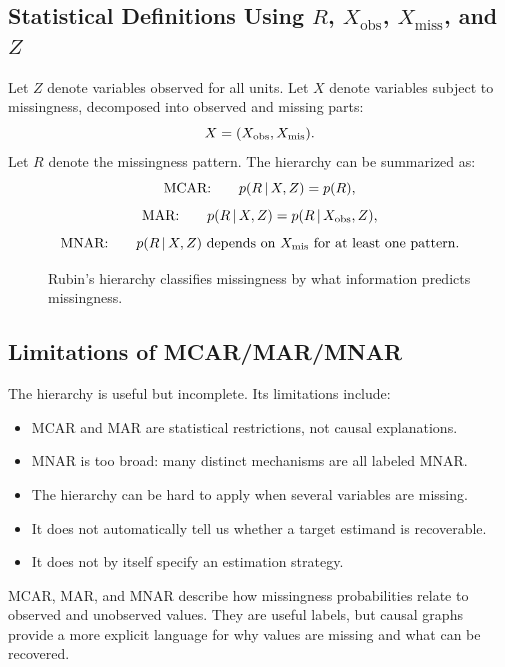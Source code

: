 \subsection{Statistical Definitions Using $R$, $X_{\text{obs}}$, $X_{\text{miss}}$, and $Z$}

Let $Z$ denote variables observed for all units. Let $X$ denote variables subject
to missingness, decomposed into observed and missing parts:
\[
  X=(X_{\mathrm{obs}},X_{\mathrm{mis}}).
\]
Let $R$ denote the missingness pattern. The hierarchy can be summarized as:
\[
  \text{MCAR:}\qquad p(R\,\vert\, X,Z)=p(R),
\]
\[
  \text{MAR:}\qquad p(R\,\vert\, X,Z)=p(R\,\vert\, X_{\mathrm{obs}},Z),
\]
\[
  \text{MNAR:}\qquad p(R\,\vert\, X,Z)
  \text{ depends on }X_{\mathrm{mis}}\text{ for at least one pattern}.
\]

\begin{figure}[H]
\centering
{}
\caption{Rubin's hierarchy classifies missingness by what information predicts missingness.}
\label{fig:ch9-rubin-hierarchy}
\end{figure}

\subsection{Limitations of MCAR/MAR/MNAR}

The hierarchy is useful but incomplete. Its limitations include:
\begin{itemize}
  \item MCAR and MAR are statistical restrictions, not causal explanations.
  \item MNAR is too broad: many distinct mechanisms are all labeled MNAR.
  \item The hierarchy can be hard to apply when several variables are missing.
  \item It does not automatically tell us whether a target estimand is
  recoverable.
  \item It does not by itself specify an estimation strategy.
\end{itemize}

\begin{keyidea}
MCAR, MAR, and MNAR describe how missingness probabilities relate to observed
and unobserved values. They are useful labels, but causal graphs provide a more
explicit language for why values are missing and what can be recovered.
\end{keyidea}

